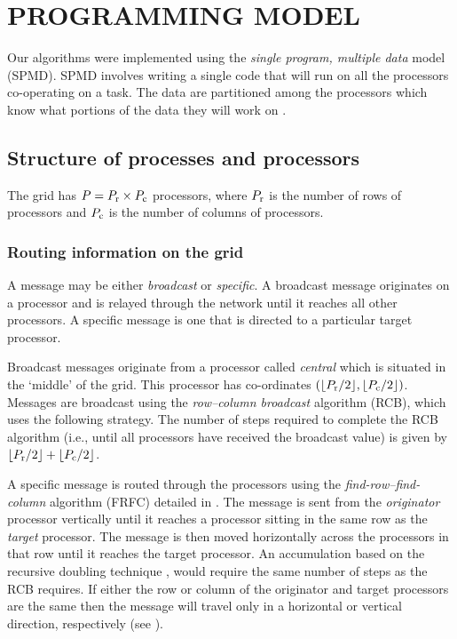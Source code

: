 \documentclass{ecai2012}
\begin{document}
\section{PROGRAMMING MODEL}
\label{par}
Our algorithms were implemented using the \emph{single program,
  multiple data} model (SPMD). SPMD involves writing a single code
that will run on all the processors co-operating on a task. The data
are partitioned among the processors which know what portions of the
data they will work on \cite{kn:Golub89}.

\subsection{Structure of processes and processors}
\label{procstruct}
The grid has $P=P_{\rm{r}}\times P_{\rm{c}}$ processors, where
$P_{\rm{r}}$ is the number of rows of processors and $P_{\rm{c}}$ is
the number of columns of processors.

\subsubsection{Routing information on the grid}
\label{routing} A message may be either \emph{broadcast} or {\em
  specific}. A broadcast message originates on a processor and is
relayed through the network until it reaches all other processors. A
specific message is one that is directed to a particular target
processor.

Broadcast messages originate from a processor called \emph{central}
which is situated in the `middle' of the grid. This processor has
co-ordinates $(\lfloor P_{\rm{r}}/2 \rfloor,\lfloor P_{\rm{c}}/2
\rfloor)$.  Messages are broadcast using the \emph{row--column
  broadcast} algorithm (RCB), which uses the following strategy.  The
number of steps required to complete the RCB algorithm (i.e., until
all processors have received the broadcast value) is given by $\lfloor
P_{\rm{r}}/2\rfloor+\lfloor P_{\rm{c}}/2\rfloor$.

A specific message is routed through the processors using the
\emph{find-row--find-column} algorithm (FRFC) detailed in
\cite{kn:deCarlini91}.  The message is sent from the \emph{originator}
processor vertically until it reaches a processor sitting in the same
row as the \emph{target} processor. The message is then moved
horizontally across the processors in that row until it reaches the
target processor. An accumulation based on the recursive doubling
technique \cite[pp. 56--61]{kn:Modi88}, would require the same number
of steps as the RCB requires. If either the row or column of the
originator and target processors are the same then the message will
travel only in a horizontal or vertical direction, respectively (see
\cite{kn:Smith85}).
\end{document}
